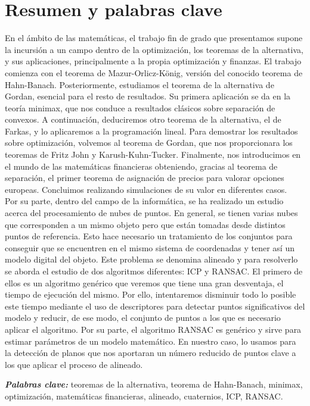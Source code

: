 \chapter{Resumen y palabras clave}

En el ámbito de las matemáticas, el trabajo fin de grado que presentamos supone la incursión a un campo dentro de la optimización, los teoremas de la alternativa, y sus aplicaciones, principalmente a la propia optimización y finanzas. El trabajo comienza con el teorema de Mazur-Orlicz-König, versión del conocido teorema de Hahn-Banach. Posteriormente, estudiamos el teorema de la alternativa de Gordan, esencial para el resto de resultados. Su primera aplicación se da en la teoría minimax, que nos conduce a resultados clásicos sobre separación de convexos. A continuación, deduciremos otro teorema de la alternativa, el de Farkas, y lo aplicaremos a la programación lineal. Para demostrar los resultados sobre optimización, volvemos al teorema de Gordan, que nos proporcionara los teoremas de Fritz John y Karush-Kuhn-Tucker. Finalmente, nos introducimos en el mundo de las matemáticas financieras obteniendo, gracias al teorema de separación, el primer teorema de asignación de precios para valorar opciones europeas. Concluimos realizando simulaciones de su valor en diferentes casos.\\

Por su parte, dentro del campo de la informática, se ha realizado un estudio acerca del procesamiento de nubes de puntos. En general, se tienen varias nubes que corresponden a un mismo objeto pero que están tomadas desde distintos puntos de referencia. Esto hace necesario un tratamiento de los conjuntos para conseguir que se encuentren en el mismo sistema de coordenadas y tener así un modelo digital del objeto. Este problema se denomina alineado y para resolverlo se aborda el estudio de dos algoritmos diferentes: ICP y RANSAC. El primero de ellos es un algoritmo genérico que veremos que tiene una gran desventaja, el tiempo de ejecución del mismo. Por ello, intentaremos disminuir todo lo posible este tiempo mediante el uso de descriptores para detectar puntos significativos del modelo y reducir, de ese modo, el conjunto de puntos a los que es necesario aplicar el algoritmo. Por su parte, el algoritmo RANSAC es genérico y sirve para estimar parámetros de un modelo matemático. En nuestro caso, lo usamos para la detección de planos que nos aportaran un número reducido de puntos clave a los que aplicar el proceso de alineado. \\

\providecommand{\pclave}[1]
{
	\small	
	\textbf{\textit{Palabras clave: }} #1
}
\pclave{teoremas de la alternativa, teorema de Hahn-Banach, minimax, optimización, matemáticas financieras, alineado, cuaternios, ICP, RANSAC.}